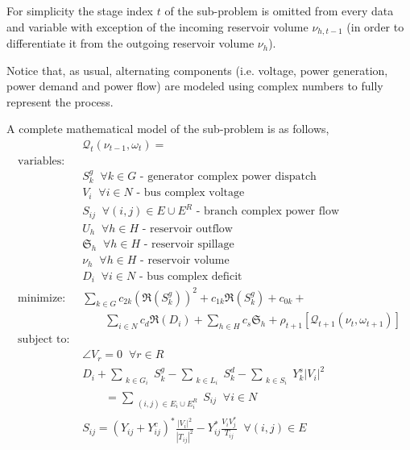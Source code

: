 \documentclass{juliacon}
\begin{document}
For simplicity the stage index $t$ of the sub-problem is omitted from every data and variable with exception of the incoming reservoir volume $\nu_{h,t-1}$ (in order to differentiate it from the outgoing reservoir volume $\nu_{h}$).

Notice that, as usual, alternating components (i.e. voltage, power generation, power demand and power flow) are modeled using complex numbers to fully represent the process.

A complete mathematical model of the sub-problem is as follows,
\begin{subequations} \label{AC_OPF}
\begin{align}
%
& \mathcal{Q}_t(\nu_{t-1},\omega_t) = \nonumber \\
%
\mbox{variables: } & \nonumber \\
& S^g_k \;\; \forall k\in G \mbox{ - generator complex power dispatch} \label{var_generation}\\
& V_i \;\; \forall i\in N \label{var_voltage} \mbox{ - bus complex voltage}\\
& S_{ij} \;\; \forall (i,j) \in E \cup E^R  \label{var_complex_power} \mbox{ - branch complex power flow}\\
& U_h \;\; \forall h \in H  \label{var_outflow} \mbox{ - reservoir outflow}\\
& \mathfrak{S}_h \;\; \forall h \in H  \label{var_spillage} \mbox{ - reservoir spillage}\\
& \nu_h \;\; \forall h \in H  \label{var_volume} \mbox{ - reservoir volume}\\
& D_i \;\; \forall i\in N \label{var_deficit} \mbox{ - bus complex deficit}\\
%
\mbox{minimize: } & \sum_{k \in G} c_{2k} (\Re(S^g_k))^2 + c_{1k}\Re(S^g_k) + c_{0k} + \nonumber\\
& \qquad \sum_{i \in N} c_{d} \Re(D_i) +  \sum_{h \in H} c_{s} \mathfrak{S}_h + \rho_{t+1}[\mathcal{Q}_{t+1}(\nu_{t}, \omega_{t+1})] \label{eq_objective}\\
%
\mbox{subject to: } & \nonumber \\
& \angle V_{r} = 0  \;\; \forall r \in R \label{eq_ref_bus}\\
& D_i+ \sum_{\substack{k \in G_i}} S^g_k - \sum_{\substack{k \in L_i}} S^d_k - \sum_{\substack{k \in S_i}} Y^s_k |V_i|^2 \nonumber \\ 
& \qquad = \sum_{\substack{(i,j)\in E_i \cup E_i^R}} S_{ij} \;\; \forall i\in N \label{eq_kcl_shunt} \\
& S_{ij} = \left( Y_{ij} + Y^c_{ij}\right)^* \frac{|V_i|^2}{|{T}_{ij}|^2} - Y^*_{ij} \frac{V_i V^*_j}{{T}_{ij}} \;\; \forall (i,j)\in E \label{eq_power_from}\\

\end{align}
\end{subequations}
\end{document}
